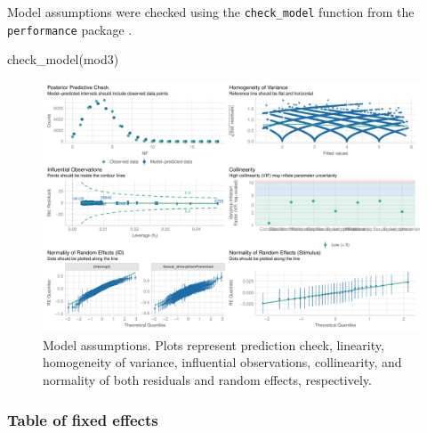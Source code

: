 \documentclass[
  bookmarksnumbered]{article}
\newenvironment{Shaded}{\begin{snugshade}}{\end{snugshade}}
\newcommand{\AttributeTok}[1]{\textcolor[rgb]{0.80,0.80,0.80}{#1}}
\newcommand{\FunctionTok}[1]{\textcolor[rgb]{0.94,0.94,0.56}{#1}}
\newcommand{\NormalTok}[1]{\textcolor[rgb]{0.80,0.80,0.80}{#1}}
\newcommand{\OtherTok}[1]{\textcolor[rgb]{0.94,0.94,0.56}{#1}}
\newcommand{\SpecialCharTok}[1]{\textcolor[rgb]{0.86,0.64,0.64}{#1}}
\begin{document}
Model assumptions were checked using the \texttt{check\_model} function from the \texttt{performance} package \autocite{ludecke2021}.

\begin{Shaded}
\begin{Highlighting}[]
\FunctionTok{check\_model}\NormalTok{(mod3)}
\end{Highlighting}
\end{Shaded}

\begin{figure}
\centering
\includegraphics{Supplementary_material_files/figure-latex/assu-mod3-1.pdf}
\caption{\label{fig:assu-mod3}Model assumptions. Plots represent prediction check, linearity, homogeneity of variance, influential observations, collinearity, and normality of both residuals and random effects, respectively.}
\end{figure}

\subsubsection{Table of fixed effects}\label{table-of-fixed-effects-2}

\begin{Shaded}
\end{Shaded}
\end{document}
